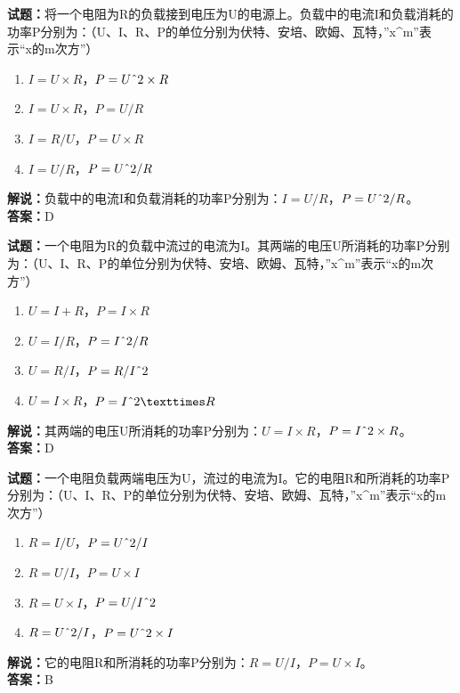 \documentclass{ctexbook}
\begin{document}
\textbf{试题：}将一个电阻为R的负载接到电压为U的电源上。负载中的电流I和负载消耗的功率P分别为：（U、I、R、P的单位分别为伏特、安培、欧姆、瓦特，”x\string^m”表示“x的m次方”）
\begin{enumerate}[leftmargin=3em]
  \item \(I = U\times R\)，\(P =U\string^2\times R\)
  \item \(I = U\times R\)，\(P =U/R\)
  \item \(I = R/U\)，\(P =U\times R\)
  \item \(I = U/R\)，\(P = U\string^2/R\)
\end{enumerate}
\noindent\textbf{解说：}负载中的电流I和负载消耗的功率P分别为：\(I = U/R\)，\(P = U\string^2/R\)。\\
\noindent\textbf{答案：}D

\vspace{1em}

\textbf{试题：}一个电阻为R的负载中流过的电流为I。其两端的电压U所消耗的功率P分别为：（U、I、R、P的单位分别为伏特、安培、欧姆、瓦特，”x\string^m”表示“x的m次方”）
\begin{enumerate}[leftmargin=3em]
  \item \(U = I + R\)，\(P =I ×R\)
  \item \(U = I / R\)，\(P = I\string^2/R\)
  \item \(U = R / I\)，\(P = R / I\string^2\)
  \item \(U = I\times R\)，\(P = I\string^2×R\)
\end{enumerate}
\noindent\textbf{解说：}其两端的电压U所消耗的功率P分别为：\(U = I\times R\)，\(P = I\string^2\times R\)。\\\noindent\textbf{答案：}D

\vspace{1em}

\textbf{试题：}一个电阻负载两端电压为U，流过的电流为I。它的电阻R和所消耗的功率P分别为：（U、I、R、P的单位分别为伏特、安培、欧姆、瓦特，”x\string^m”表示“x的m次方”）
\begin{enumerate}[leftmargin=3em]
  \item \(R = I / U\)，\(P = U\string^2/I\)
  \item \(R = U/I\)，\(P = U\times I\)
  \item \(R = U\times I\)，\(P = U/ I\string^2\)
  \item \(R = U\string^2/I\)，\(P = U\string^2\times I\)
\end{enumerate}
\noindent\textbf{解说：}它的电阻R和所消耗的功率P分别为：\(R = U/I\)，\(P = U\times I\)。\\
\noindent\textbf{答案：}B
\end{document}
